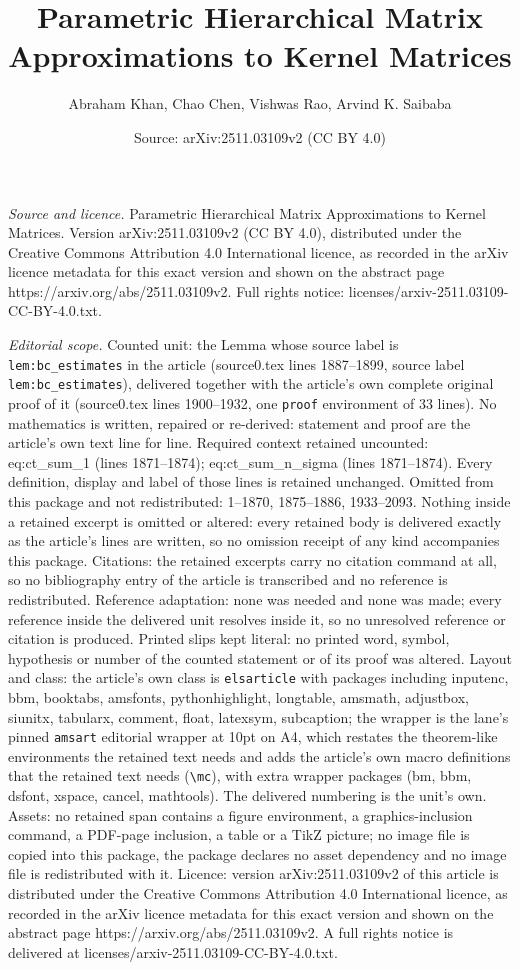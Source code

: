 \documentclass[10pt,a4paper]{amsart}
\title[Parametric Hierarchical Matrix Approximations to Kernel Matr]{Parametric Hierarchical Matrix Approximations to Kernel Matrices}
\author{Abraham Khan, Chao Chen, Vishwas Rao, Arvind K. Saibaba}
\date{Source: arXiv:2511.03109v2 (CC BY 4.0)}
\begin{document}
\maketitle

\noindent\emph{Source and licence.} Parametric Hierarchical Matrix Approximations to Kernel Matrices. Version arXiv:2511.03109v2 (CC BY 4.0), distributed under the Creative Commons Attribution 4.0 International licence, as recorded in the arXiv licence metadata for this exact version and shown on the abstract page https://arxiv.org/abs/2511.03109v2. Full rights notice: licenses/arxiv-2511.03109-CC-BY-4.0.txt.\par\smallskip

\noindent\textit{Editorial scope.} Counted unit: the Lemma whose source label is \texttt{lem:bc\_estimates} in the article (source0.tex lines 1887--1899, source label \texttt{lem:bc\_estimates}), delivered together with the article's own complete original proof of it (source0.tex lines 1900--1932, one \texttt{proof} environment of 33 lines). No mathematics is written, repaired or re-derived: statement and proof are the article's own text line for line. Required context retained uncounted: eq:ct\_sum\_1 (lines 1871--1874); eq:ct\_sum\_n\_sigma (lines 1871--1874). Every definition, display and label of those lines is retained unchanged. Omitted from this package and not redistributed: 1--1870, 1875--1886, 1933--2093. Nothing inside a retained excerpt is omitted or altered: every retained body is delivered exactly as the article's lines are written, so no omission receipt of any kind accompanies this package. Citations: the retained excerpts carry no citation command at all, so no bibliography entry of the article is transcribed and no reference is redistributed. Reference adaptation: none was needed and none was made; every reference inside the delivered unit resolves inside it, so no unresolved reference or citation is produced. Printed slips kept literal: no printed word, symbol, hypothesis or number of the counted statement or of its proof was altered. Layout and class: the article's own class is \texttt{elsarticle} with packages including inputenc, bbm, booktabs, amsfonts, pythonhighlight, longtable, amsmath, adjustbox, siunitx, tabularx, comment, float, latexsym, subcaption; the wrapper is the lane's pinned \texttt{amsart} editorial wrapper at 10pt on A4, which restates the theorem-like environments the retained text needs and adds the article's own macro definitions that the retained text needs (\texttt{\textbackslash mc}), with extra wrapper packages (bm, bbm, dsfont, xspace, cancel, mathtools). The delivered numbering is the unit's own. Assets: no retained span contains a figure environment, a graphics-inclusion command, a PDF-page inclusion, a table or a TikZ picture; no image file is copied into this package, the package declares no asset dependency and no image file is redistributed with it. Licence: version arXiv:2511.03109v2 of this article is distributed under the Creative Commons Attribution 4.0 International licence, as recorded in the arXiv licence metadata for this exact version and shown on the abstract page https://arxiv.org/abs/2511.03109v2. A full rights notice is delivered at licenses/arxiv-2511.03109-CC-BY-4.0.txt. 
\end{document}
